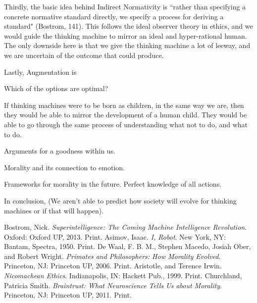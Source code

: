 \documentclass[11pt, oneside]{article}
\begin{document}
\par Thirdly, the basic idea behind Indirect Normativity is ``rather than specifying a concrete normative standard directly, we specify a process for deriving a standard" (Bostrom, 141). This follows the ideal observer theory in ethics, and we would guide the thinking machine to mirror an ideal and hyper-rational human. The only downside here is that we give the thinking machine a lot of leeway, and we are uncertain of the outcome that could produce. 

\par Lastly, Augmentation is 

\par Which of the options are optimal? 

\par If thinking machines were to be born as children, in the same way we are, then they would be able to mirror the development of a human child. They would be able to go through the same process of understanding what not to do, and what to do. 

\par Arguments for a goodness within us. 

\par Morality and its connection to emotion.

\par Frameworks for morality in the future. Perfect knowledge of all actions. 

\par In conclusion, (We aren't able to predict how society will evolve for thinking machines or if that will happen).

\begin{thebibliography}{9}
  Bostrom, Nick. 
  \emph{Superintelligence: The Coming Machine Intelligence Revolution}.
  Oxford: Oxford UP, 2013. 
  Print.
  Asimov, Isaac.
  \emph{I, Robot}.
  New York, NY: Bantam, Spectra, 1950.
  Print.
  De Waal, F. B. M., Stephen Macedo, Josiah Ober, and Robert Wright.
  \emph{Primates and Philosophers: How Morality Evolved}.
  Princeton, NJ: Princeton UP, 2006.
  Print.
  Aristotle, and Terence Irwin.
  \emph{Nicomachean Ethics}.
  Indianapolis, IN: Hackett Pub., 1999.
  Print.
  Churchland, Patricia Smith.
  \emph{Braintrust: What Neuroscience Tells Us about Morality}.
  Princeton, NJ: Princeton UP, 2011. 
  Print.
\end{thebibliography}
\end{document}
